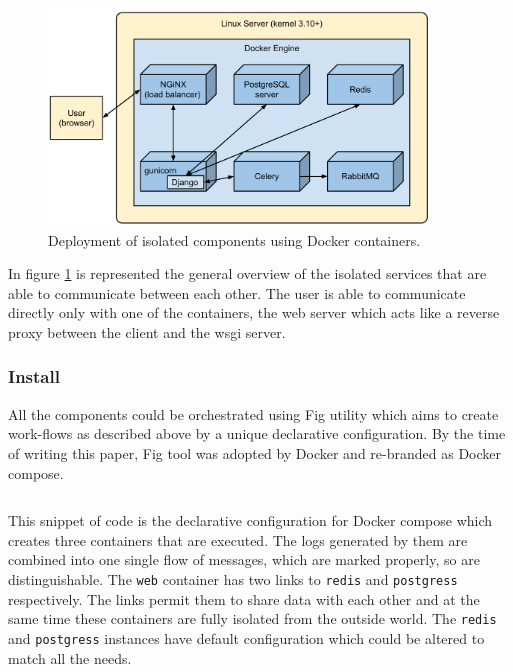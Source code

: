 \documentclass[12pt,oneside,a4paper]{article}
\begin{document}
\begin{figure}[!ht]
  \centering
    \includegraphics[width=0.9\textwidth]{pic/deployment-diagram.pdf}
    \caption{Deployment of isolated components using Docker containers.}
    \label{fig:deployment-diagram}
\end{figure}

In figure \ref{fig:deployment-diagram} is represented the general overview of the isolated services that are able to communicate between each other. The user is able to communicate directly only with one of the containers, the web server which acts like a reverse proxy between the client and the wsgi server.

\subsubsection{Install}
All the components could be orchestrated using Fig utility which aims to create work-flows as described above by a unique declarative configuration. By the time of writing this paper, Fig tool was adopted by Docker and re-branded as Docker compose.

\inputminted[linenos,baselinestretch=1,xleftmargin=0.5cm]{yaml}{src/docker-compose.yml}

This snippet of code is the declarative configuration for Docker compose which creates three containers that are executed. The logs generated by them are combined into one single flow of messages, which are marked properly, so are distinguishable. The \texttt{web} container has two links to \texttt{redis} and \texttt{postgress} respectively. The links permit them to share data with each other and at the same time these containers are fully isolated from the outside world. The \texttt{redis} and \texttt{postgress} instances have default configuration which could be altered to match all the needs.
\end{document}
